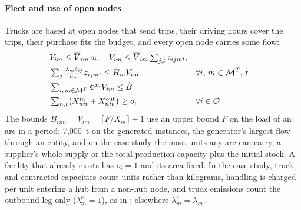 \documentclass[review,11pt,nonatbib]{elsarticle}
\theoremstyle{remark}
\newcommand{\Xin}{X^{\mathrm{in}}}
\newcommand{\Xout}{X^{\mathrm{out}}}
\begin{document}
\paragraph{Fleet and use of open nodes} Trucks are based at open nodes that send trips, their driving hours cover the trips, their purchase fits the budget, and every open node carries some flow:
\begin{align}
& V_{im} \le \overline{V}_{im}\, o_i, \quad V_{im} \le \overline{V}_{im} \textstyle\sum_{j, t} z_{ijmt}, \notag\\
& \textstyle\sum_{j} \frac{\lambda_m \delta_{ij}}{\nu_m} z_{ijmt} \le \hat{H}_m V_{im} && \forall i,\, m \in \mathcal{M}^T,\, t \label{eq:fleet}\\
& \textstyle\sum_{i,\, m \in \mathcal{M}^T} \Phi^{m} V_{im} \le \hat{B} \label{eq:budget}\\
& \textstyle\sum_{n,t} \bigl( \Xin_{nit} + \Xout_{nit} \bigr) \ge o_i && \forall i \in \mathcal{O} \label{eq:use}
\end{align}
The bounds $B_{ijm} = \overline{V}_{im} = \lceil \bar{F}/\overline{X}_m \rceil + 1$ use an upper bound $\bar{F}$ on the load of an arc in a period: 7{,}000~t on the generated instances, the generator's largest flow through an entity, and on the case study the most units any arc can carry, a supplier's whole supply or the total production capacity plus the initial stock. A facility that already exists has $o_i = 1$ and its area fixed. In the case study, truck and contracted capacities count units rather than kilograms, handling is charged per unit entering a hub from a non-hub node, and truck emissions count the outbound leg only ($\lambda^e_m = 1$), as in \textcite{mota2018sustainable}; elsewhere $\lambda^e_m = \lambda_m$.
\end{document}
